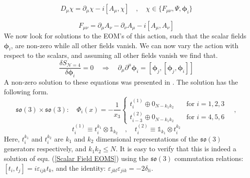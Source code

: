 \newpage
%
%
\begin{equation}
D_\mu \chi = \partial_\mu \chi - i [A_\mu, \chi]
%
\quad , \quad
%
\chi \in \{F_{\mu\nu}, \Psi, \boldsymbol{\phi}_i \}
\end{equation}
%
%

%
%
\begin{equation}
F_{\mu\nu} = \partial_\mu A_\nu - \partial_\nu A_\mu -i [A_\mu, A_\nu]
\end{equation}
%
%
We now look for solutions to the EOM's of this action, such that the scalar fields $\boldsymbol{\phi}_i$, are non-zero while all other fields vanish. We can now vary the action with respect to the scalars, and assuming all other fields vanish we find that.
%
%
\begin{equation}\label{Scalar Field EOMS}
\frac{\delta S_{\mathcal{N} = 4}}{\delta \boldsymbol{\phi}_i} = 0
%
\quad \Rightarrow \quad
%
\partial_\mu \partial^\mu \boldsymbol{\phi}_i
=
[\boldsymbol{\phi}_j, [\boldsymbol{\phi}_j, \boldsymbol{\phi}_i]]
\end{equation}
%
%
%		
A non-zero solution to these equations was presented in \cite{One-point functions in D3-D7}. The solution has the following form.
%
%
\begin{equation*}
\mathfrak{so}(3) \times \mathfrak{so}(3) :
%
\quad
%
\Phi_i(x)
=
-\frac{1}{x_3}
	\begin{cases}
		t_i^{(1)} \oplus 0_{N-k_1 k_2}
		& \quad \text{for } i = 1,2,3 \\
		
    	t_{i-3}^{(2)} \oplus 0_{N-k_1 k_2}
    	& \quad \text{for } i = 4,5,6
  \end{cases}
\quad ,
\end{equation*}
%
%
\begin{equation}\label{cl solution a}
t_i^{(1)} \equiv t_i^{k_1} \otimes \mathbb{1}_{k_2}
%
\quad , \quad
t_i^{(2)} \equiv \mathbb{1}_{k_1} \otimes t_i^{k_2}
\end{equation}
%
%
Here, $t_i^{k_1}$ and $t_i^{k_2}$ are $k_1$ and $k_2$ dimensional representations of the $\mathfrak{so}(3)$ generators respectively, and $k_1 k_2 \leq N$. It is easy to verify that this is indeed a solution of equ. (\ref{Scalar Field EOMS}) using the $\mathfrak{so}(3)$ commutation relations: $[t_i, t_j] = i \varepsilon_{ijk} t_k$, and the identity: $\varepsilon_{jkl} \varepsilon_{jik} = -2 \delta_{li}$.
